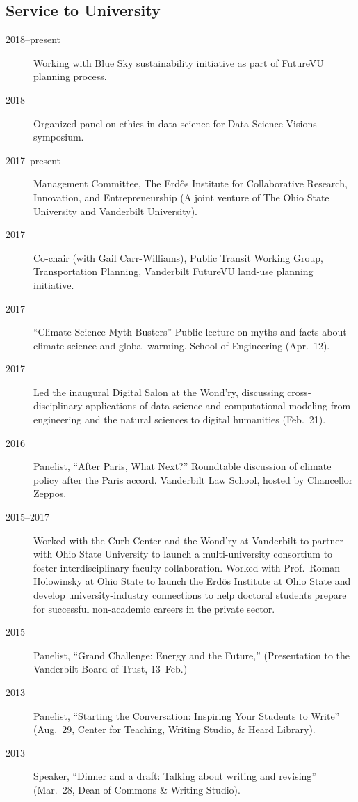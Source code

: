 \documentclass[10pt]{article}
\begin{document}
	\subsection{Service to University}
    	\begin{description}
    		\item[2018--present] Working with Blue Sky sustainability initiative as part of FutureVU planning process.
            \item[2018] Organized panel on ethics in data science for Data Science Visions symposium.
            \item[2017--present] Management Committee, The Erd\H{o}s Institute for Collaborative Research, Innovation, and Entrepreneurship (A joint venture of The Ohio State University and Vanderbilt University).
            \item[2017] Co-chair (with Gail Carr-Williams), Public Transit Working Group, Transportation Planning, Vanderbilt FutureVU land-use planning initiative.
            \item[2017] ``Climate Science Myth Busters'' Public lecture on myths and facts about climate science and global warming. School of Engineering (Apr.~12).
            \item[2017] Led the inaugural Digital Salon at the Wond'ry, discussing cross-disciplinary applications of data science and computational modeling from engineering and the natural sciences to digital humanities (Feb.~21).
            \item[2016] Panelist, ``After Paris, What Next?''  Roundtable discussion of climate policy after the Paris accord. Vanderbilt Law School, hosted by Chancellor Zeppos.
            \item[2015--2017] Worked with the Curb Center and the Wond'ry at Vanderbilt to partner with Ohio State University to launch a multi-university consortium to foster interdisciplinary faculty collaboration.  Worked with Prof.\ Roman Holowinsky at Ohio State to launch the Erd\"os Institute at Ohio State and develop university-industry connections to help doctoral students prepare for successful non-academic careers in the private sector.
        	\item[2015] Panelist, ``Grand Challenge: Energy and the Future,'' (Presentation to the Vanderbilt Board of Trust, 13~Feb.)
    	    \item[2013] Panelist, ``Starting the Conversation: Inspiring Your Students to Write'' (Aug.~29, Center for Teaching, Writing Studio, \& Heard Library).
    	    \item[2013] Speaker, ``Dinner and a draft: Talking about writing and revising'' (Mar.~28, Dean of Commons \& Writing Studio).

\end{description}
\end{document}
